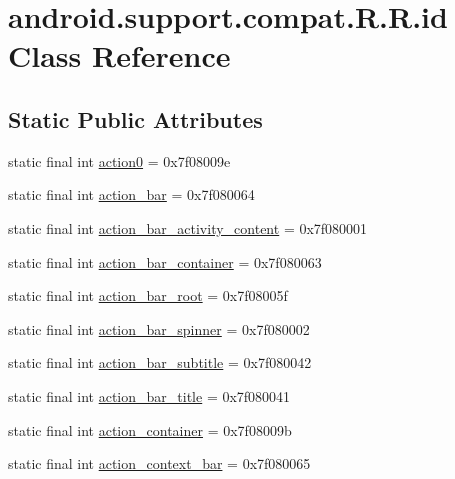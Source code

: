 \hypertarget{classandroid_1_1support_1_1compat_1_1_r_1_1id}{
\section{android.support.compat.R.R.id Class Reference}
\label{classandroid_1_1support_1_1compat_1_1_r_1_1id}
}
\subsection*{Static Public Attributes}
\begin{CompactItemize}
\item 
static final int \hyperlink{classandroid_1_1support_1_1compat_1_1_r_1_1id_b841660b3416ed60cf324155f916740d}{action0} = 0x7f08009e
\item 
static final int \hyperlink{classandroid_1_1support_1_1compat_1_1_r_1_1id_a2c397bdcd1b2640a4a61efcd56a01f0}{action\_\-bar} = 0x7f080064
\item 
static final int \hyperlink{classandroid_1_1support_1_1compat_1_1_r_1_1id_80189ae1bc621428c027db4b8e398c63}{action\_\-bar\_\-activity\_\-content} = 0x7f080001
\item 
static final int \hyperlink{classandroid_1_1support_1_1compat_1_1_r_1_1id_265515cbb2241ce283a6c25b2b45cbf0}{action\_\-bar\_\-container} = 0x7f080063
\item 
static final int \hyperlink{classandroid_1_1support_1_1compat_1_1_r_1_1id_0cfe5e85c5e66db6cdecb5e79e998825}{action\_\-bar\_\-root} = 0x7f08005f
\item 
static final int \hyperlink{classandroid_1_1support_1_1compat_1_1_r_1_1id_00640bcecedc70fa31c8877fd32aa3bf}{action\_\-bar\_\-spinner} = 0x7f080002
\item 
static final int \hyperlink{classandroid_1_1support_1_1compat_1_1_r_1_1id_376f9bac1e7a0044df8fcd33c020ed66}{action\_\-bar\_\-subtitle} = 0x7f080042
\item 
static final int \hyperlink{classandroid_1_1support_1_1compat_1_1_r_1_1id_3596f4c73ae85552846bb8319bc9461f}{action\_\-bar\_\-title} = 0x7f080041
\item 
static final int \hyperlink{classandroid_1_1support_1_1compat_1_1_r_1_1id_f8714b54be33c2705322735872970913}{action\_\-container} = 0x7f08009b
\item 
static final int \hyperlink{classandroid_1_1support_1_1compat_1_1_r_1_1id_83481e87569048ece81f5e44c604ffab}{action\_\-context\_\-bar} = 0x7f080065
\item 

\end{CompactItemize}
